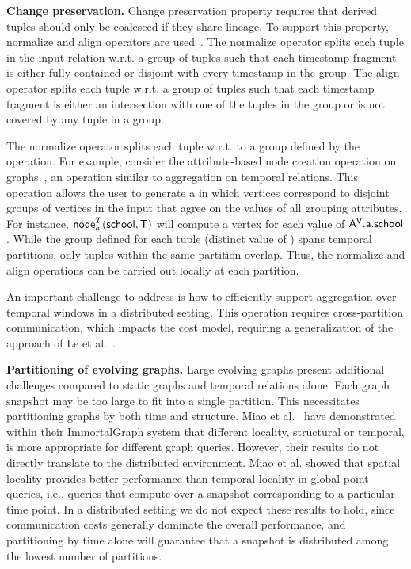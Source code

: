 {\bf Change preservation.}  Change preservation property requires that
derived tuples should only be coalesced if they share lineage.  To
support this property, normalize and align operators are
used~\cite{Dignos2012}.  The normalize operator splits each tuple in
the input relation w.r.t. a group of tuples such that each timestamp
fragment is either fully contained or disjoint with every timestamp in
the group.  The align operator splits each tuple w.r.t. a group of
tuples such that each timestamp fragment is either an intersection
with one of the tuples in the group or is not covered by any tuple in
a group.

The normalize operator splits each tuple w.r.t. to a group defined by
the operation.  For example, consider the attribute-based node
creation operation on graphs~\cite{PortalarXiv2016}, an operation
similar to aggregation on temporal relations.  This operation allows
the user to generate a \tg in which vertices correspond to disjoint
groups of vertices in the input that agree on the values of all
grouping attributes.  For instance,
$\textsf{node}^T_a(\textsf{school},\mathsf{T})$ will compute a vertex for each
value of $\textsf{\ensuremath{\mathsf{A^{V}}}.a.school}$.  While the group defined for each
tuple (distinct value of ) spans temporal partitions,
only tuples within the same partition overlap.  Thus, the normalize
and align operations can be carried out locally at each partition.

An important challenge to address is how to efficiently support
aggregation over temporal windows in a distributed setting.  This
operation requires cross-partition communication, which impacts the
cost model, requiring a generalization of the approach of Le et
al.~\cite{Le2013}.

{\bf Partitioning of evolving graphs.}  Large evolving graphs present
additional challenges compared to static graphs and temporal relations
alone.  Each graph snapshot may be too large to fit into a single
partition.  This necessitates partitioning graphs by both time and
structure.  Miao et al.~\cite{Miao2015} have demonstrated within their
ImmortalGraph system that different locality, structural or temporal,
is more appropriate for different graph queries.  However, their
results do not directly translate to the distributed environment.
Miao et al. showed that spatial locality provides better performance
than temporal locality in global point queries, i.e., queries that
compute over a snapshot corresponding to a particular time point.  In
a distributed setting we do not expect these results to hold, since
communication costs generally dominate the overall performance, and
partitioning by time alone will guarantee that a snapshot is
distributed among the lowest number of partitions.

